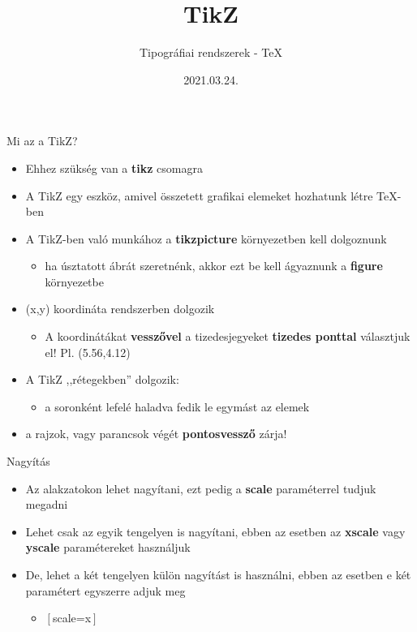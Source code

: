 \documentclass[11pt]{beamer}
\author{Tipográfiai rendszerek - \TeX}
\title{TikZ}
\date{2021.03.24.}
\begin{document}
\begin{frame}
\titlepage
\end{frame}


\begin{frame}{Mi az a TikZ?}
\begin{itemize}
\item Ehhez szükség van a \textbf{tikz} csomagra
\item A TikZ egy eszköz, amivel összetett grafikai elemeket hozhatunk létre \TeX{}-ben 
\item A TikZ-ben való munkához a \textbf{tikzpicture} környezetben kell dolgoznunk
	\begin{itemize}
	\item ha úsztatott ábrát szeretnénk, akkor ezt be kell ágyaznunk a \textbf{figure} környezetbe
	\end{itemize}
\item (x,y) koordináta rendszerben dolgozik
	\begin{itemize}
	\item A koordinátákat \textbf{vesszővel} a tizedesjegyeket \textbf{tizedes ponttal} választjuk el! Pl. (5.56,4.12)
	\end{itemize}
\item A TikZ ,,rétegekben'' dolgozik:
	\begin{itemize}
	\item a soronként lefelé haladva fedik le egymást az elemek
	\end{itemize}
\item a rajzok, vagy parancsok végét \textbf{pontosvessző} zárja!
\end{itemize}
\end{frame}

\begin{frame}{Nagyítás}
\begin{itemize}
\item Az alakzatokon lehet nagyítani, ezt pedig a \textbf{scale} paraméterrel tudjuk megadni
\item Lehet csak az egyik tengelyen is nagyítani, ebben az esetben az \textbf{xscale} vagy \textbf{yscale} paramétereket használjuk
\item De, lehet a két tengelyen külön nagyítást is használni, ebben az esetben e két paramétert egyszerre adjuk meg
	\begin{itemize}
	\item $\left[\right.$scale=x$\left.\right]$
	\end{itemize}
\end{itemize}

\end{frame}
\end{document}
